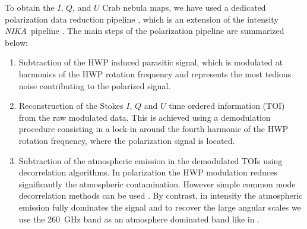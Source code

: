 \documentclass[twocolumn,traditabstract]{aa}
\def\NIKA{\textit{NIKA}}
\begin{document}
To obtain the $I$, $Q$, and $U$ Crab nebula maps, we have used a dedicated
polarization data reduction pipeline \citep{ritacco2017}, which is an extension
of the intensity \NIKA\ pipeline \citep{catalano2014,adam2013}. The main steps
of the polarization pipeline are summarized below:
\begin{enumerate}
\item  Subtraction of the HWP induced parasitic signal, which is modulated at harmonics of the HWP rotation frequency and represents the most tedious noise contributing to the polarized signal. 
\item Reconstruction of the Stokes $I$, $Q$ and $U$ time ordered information (TOI) from the raw modulated data. This is achieved using a demodulation procedure consisting in a lock-in around the fourth harmonic of the HWP rotation frequency, where the polarization signal is located.
\item Subtraction of the atmospheric emission in the demodulated TOIs using
  decorrelation algorithms. In polarization the HWP modulation reduces
  significantly the atmospheric contamination. However simple common mode
  decorrelation methods can be used \citep{ritacco2017}. By contrast, in
  intensity the atmospheric emission fully dominates the signal and to recover
  the large angular scales we use the 260~GHz band as an atmosphere
  dominated band like in \cite{adam2013}.



\end{enumerate}
\end{document}
